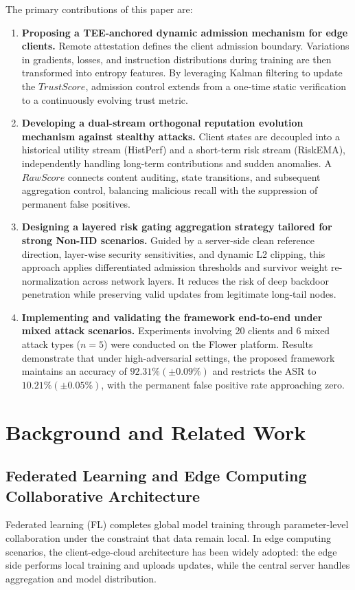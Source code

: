 \documentclass[final,5p,times,twocolumn]{elsarticle/elsarticle}
\newenvironment{tightenumerate}{%
  \begin{enumerate}\setlength{\itemsep}{1pt}\setlength{\parskip}{0pt}\setlength{\parsep}{0pt}}{\end{enumerate}}
\begin{document}
The primary contributions of this paper are:
\begin{tightenumerate}
    \item \textbf{Proposing a TEE-anchored dynamic admission mechanism for edge clients.} Remote attestation defines the client admission boundary. Variations in gradients, losses, and instruction distributions during training are then transformed into entropy features. By leveraging Kalman filtering to update the $TrustScore$, admission control extends from a one-time static verification to a continuously evolving trust metric.
    \item \textbf{Developing a dual-stream orthogonal reputation evolution mechanism against stealthy attacks.} Client states are decoupled into a historical utility stream (HistPerf) and a short-term risk stream (RiskEMA), independently handling long-term contributions and sudden anomalies. A $RawScore$ connects content auditing, state transitions, and subsequent aggregation control, balancing malicious recall with the suppression of permanent false positives.
    \item \textbf{Designing a layered risk gating aggregation strategy tailored for strong Non-IID scenarios.} Guided by a server-side clean reference direction, layer-wise security sensitivities, and dynamic L2 clipping, this approach applies differentiated admission thresholds and survivor weight re-normalization across network layers. It reduces the risk of deep backdoor penetration while preserving valid updates from legitimate long-tail nodes.
    \item \textbf{Implementing and validating the framework end-to-end under mixed attack scenarios.} Experiments involving 20 clients and 6 mixed attack types ($n=5$) were conducted on the Flower platform. Results demonstrate that under high-adversarial settings, the proposed framework maintains an accuracy of $92.31\% (\pm 0.09\%)$ and restricts the ASR to $10.21\% (\pm 0.05\%)$, with the permanent false positive rate approaching zero.
\end{tightenumerate}

\section{Background and Related Work}

\subsection{Federated Learning and Edge Computing Collaborative Architecture}
Federated learning (FL) completes global model training through parameter-level collaboration under the constraint that data remain local. In edge computing scenarios, the client-edge-cloud architecture has been widely adopted: the edge side performs local training and uploads updates, while the central server handles aggregation and model distribution.
\end{document}
